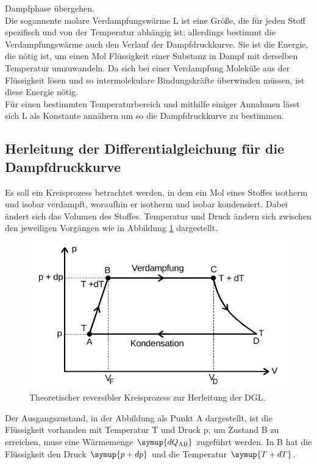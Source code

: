 Dampfphase übergehen. \\
Die sogannente molare Verdampfungswärme L ist eine Größe, die für jeden Stoff spezifisch und von der 
Temperatur abhängig ist; allerdings bestimmt die Verdampfungswärme auch den Verlauf der 
Dampfdruckkurve. Sie ist die Energie, die nötig ist, um einen Mol Flüssigkeit einer Substanz 
in Dampf mit derselben Temperatur umzuwandeln. Da sich bei einer Verdampfung Moleküle aus der Flüssigkeit
lösen und so intermolekulare Bindungskräfte überwinden müssen, ist diese Energie nötig. \\
Für einen bestimmten Temperaturbereich und mithilfe einiger Annahmen lässt sich
L als Konstante annähern um so die Dampfdruckkurve zu bestimmen. \\

\subsection{Herleitung der Differentialgleichung für die Dampfdruckkurve}
Es soll ein Kreisprozess betrachtet werden, in dem ein Mol eines Stoffes isotherm und isobar verdampft, 
woraufhin er isotherm und isobar kondensiert. Dabei ändert sich das Volumen des Stoffes. Temperatur
und Druck ändern sich zwischen den jeweiligen Vorgängen wie in Abbildung \ref{fig:kreis} dargestellt.
\begin{figure}
    \centering
    \includegraphics[width=\textwidth]{kreisprozess.png}
    \caption{Theoretischer reversibler Kreisprozess zur Herleitung der DGL.}
    \label{fig:kreis}
\end{figure}
Der Ausgangszustand, in der Abbildung als Punkt A dargestellt, ist die Flüssigkeit vorhanden mit 
Temperatur T und Druck p; um Zustand B zu erreichen, muss eine Wärmemenge $\symup{dQ_\text{AB}}$
zugeführt werden. In B hat die Flüssigkeit den Druck $\symup{p + dp}$ und die Temperatur $\symup{T + dT}$.
